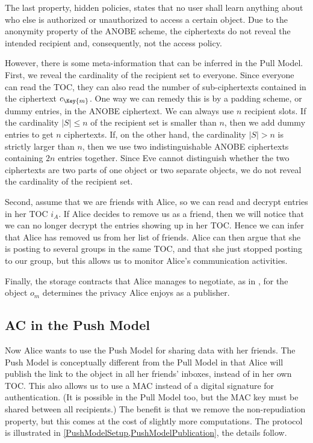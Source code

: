 The last property, hidden policies, states that no user shall learn anything 
about who else is authorized or unauthorized to access a certain object.
Due to the anonymity property of the \ac{ANOBE} scheme, the ciphertexts do not 
reveal the intended recipient and, consequently, not the access policy.

However, there is some meta-information that can be inferred in the Pull Model.
First, we reveal the cardinality of the recipient set to everyone.
Since everyone can read the \ac{TOC}, they can also read the number of 
sub-ciphertexts contained in the ciphertext \(c_{\Key{m}}\).
One way we can remedy this is by a padding scheme, or dummy entries, in the 
\ac{ANOBE} ciphertext.
We can always use \(n\) recipient slots.
If the cardinality \(|S|\leq n\) of the recipient set is smaller than \(n\), 
then we add dummy entries to get \(n\) ciphertexts.
If, on the other hand, the cardinality \(|S| > n\) is strictly larger than 
\(n\), then we use two indistinguishable \ac{ANOBE} ciphertexts containing 
\(2n\) entries together.
Since Eve cannot distinguish whether the two ciphertexts are two parts of one 
object or two separate objects, we do not reveal the cardinality of the 
recipient set.

Second, assume that we are friends with Alice, so we can read and decrypt 
entries in her \ac{TOC} \(i_A\).
If Alice decides to remove us as a friend, then we will notice that we can no 
longer decrypt the entries showing up in her \ac{TOC}.
Hence we can infer that Alice has removed us from her list of friends.
Alice can then argue that she is posting to several groups in the same 
\ac{TOC}, and that she just stopped posting to our group, but this allows us to 
monitor Alice's communication activities.

Finally, the storage contracts that Alice manages to negotiate, as in 
\cite{DataAvailability}, for the object \(o_m\) determines the privacy Alice 
enjoys as a publisher.

\subsection{\Acl*{AC} in the Push Model}\label{sec:PushModelAC}

Now Alice wants to use the Push Model for sharing data with her friends.
The Push Model is conceptually different from the Pull Model in that Alice will 
publish the link to the object in all her friends' inboxes, instead of in her 
own \ac{TOC}.
This also allows us to use a \ac{MAC} instead of a digital signature for 
authentication.
(It is possible in the Pull Model too, but the \ac{MAC} key must be shared 
between all recipients.)
The benefit is that we remove the non-repudiation property, but this comes at 
the cost of slightly more computations.
The protocol is illustrated in \cref{PushModelSetup,PushModelPublication}, the 
details follow.

